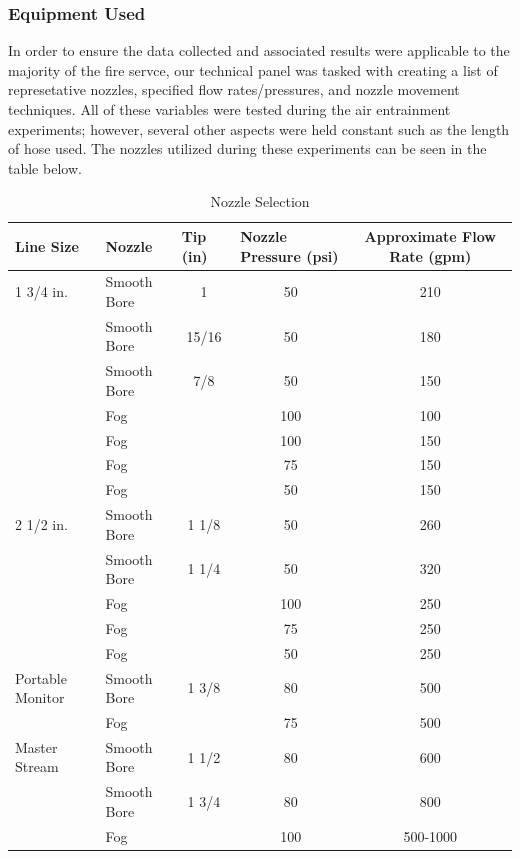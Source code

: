 \documentclass{article}
\begin{document}
\clearpage

\subsubsection{Equipment Used}

In order to ensure the data collected and associated results were applicable to the majority of the fire servce, our technical panel was tasked with creating a list of represetative nozzles, specified flow rates/pressures, and nozzle movement techniques. All of these variables were tested during the air entrainment experiments; however, several other aspects were held constant such as the length of hose used. The nozzles utilized during these experiments can be seen in the table below.

\begin{table}[]
\centering
\begin{tabular}{|llccc|}
\hline
\multicolumn{1}{|l|}{\textbf{Line Size}} & \multicolumn{1}{l|}{\textbf{Nozzle}} & \multicolumn{1}{l|}{\textbf{Tip (in)}} & \multicolumn{1}{l|}{\textbf{Nozzle Pressure (psi)}} & \textbf{Approximate Flow Rate (gpm)} \\ \hline
1 3/4 in. & Smooth Bore & 1 & 50 & 210 \\
 & Smooth Bore & 15/16 & 50 & 180 \\
 & Smooth Bore & 7/8 & 50 & 150 \\
 & Fog &  & 100 & 100 \\
 & Fog &  & 100 & 150 \\
 & Fog &  & 75 & 150 \\
 & Fog &  & 50 & 150 \\ \hline
2 1/2 in. & Smooth Bore & 1 1/8 & 50 & 260 \\
 & Smooth Bore & 1 1/4 & 50 & 320 \\
 & Fog &  & 100 & 250 \\
 & Fog &  & 75 & 250 \\
 & Fog &  & 50 & 250 \\ \hline
Portable Monitor & Smooth Bore & 1 3/8 & 80 & 500 \\
 & Fog &  & 75 & 500 \\ \hline
Master Stream & Smooth Bore & 1 1/2 & 80 & 600 \\
 & Smooth Bore & 1 3/4 & 80 & 800 \\
 & Fog &  & 100 & 500-1000 \\ \hline
\end{tabular}
\caption{Nozzle Selection}
\label{Nozzle Selection}
\end{table}
\end{document}
